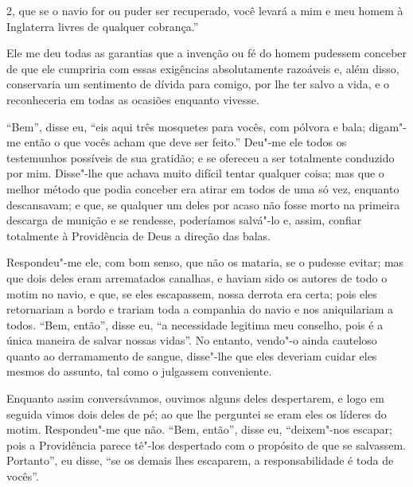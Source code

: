 2, que se o navio for ou puder ser recuperado, você levará a mim e meu
homem à Inglaterra livres de qualquer cobrança.''

Ele me deu todas as garantias que a invenção ou fé do homem pudessem
conceber de que ele cumpriria com essas exigências absolutamente
razoáveis e, além disso, conservaria um sentimento de dívida para
comigo, por lhe ter salvo a vida, e o reconheceria em todas as ocasiões
enquanto vivesse.

``Bem'', disse eu, ``eis aqui três mosquetes para vocês, com pólvora e
bala; digam"-me então o que vocês acham que deve ser feito.'' Deu"-me ele
todos os testemunhos possíveis de sua gratidão; e se ofereceu a ser
totalmente conduzido por mim. Disse"-lhe que achava muito difícil tentar
qualquer coisa; mas que o melhor método que podia conceber era atirar em
todos de uma só vez, enquanto descansavam; e que, se qualquer um deles
por acaso não fosse morto na primeira descarga de munição e se rendesse,
poderíamos salvá"-lo e, assim, confiar totalmente à Providência de Deus a
direção das balas.

Respondeu"-me ele, com bom senso, que não os mataria, se o pudesse
evitar; mas que dois deles eram arrematados canalhas, e haviam sido os
autores de todo o motim no navio, e que, se eles escapassem, nossa
derrota era certa; pois eles retornariam a bordo e trariam toda a
companhia do navio e nos aniquilariam a todos. ``Bem, então'', disse eu,
``a necessidade legitima meu conselho, pois é a única maneira de salvar
nossas vidas''. No entanto, vendo"-o ainda cauteloso quanto ao
derramamento de sangue, disse"-lhe que eles deveriam cuidar eles mesmos
do assunto, tal como o julgassem conveniente.

Enquanto assim conversávamos, ouvimos alguns deles despertarem, e logo
em seguida vimos dois deles de pé; ao que lhe perguntei se eram eles os
líderes do motim. Respondeu"-me que não. ``Bem, então'', disse eu,
``deixem"-nos escapar; pois a Providência parece tê"-los despertado com o
propósito de que se salvassem. Portanto'', eu disse, ``se os demais lhes
escaparem, a responsabilidade é toda de vocês''.

